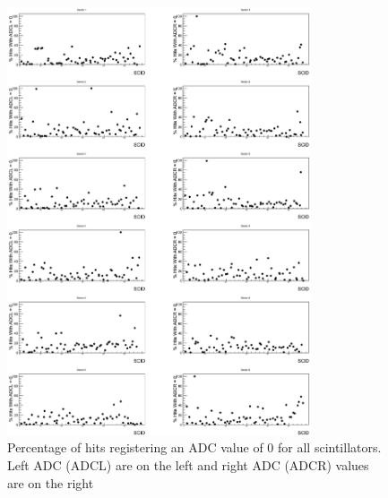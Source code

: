 \begin{figure}
    \includegraphics[width=0.8\textwidth]{figures/calib/tof/tofko/adc.eps}
    \caption{Percentage of hits registering an ADC value of 0 for all scintillators. Left ADC (ADCL) are on the left and right ADC (ADCR) values are on the right}
    \label{plt:adc0vSCID}
\end{figure}

